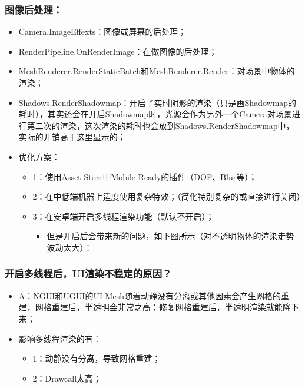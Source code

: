 \documentclass[9pt, b5paper]{article}
\begin{document}
\subsubsection{图像后处理：}
\label{sec:org6a1f73b}
\begin{itemize}
\item Camera.ImageEffexts：图像或屏幕的后处理；
\item RenderPipeline.OnRenderImage：在做图像的后处理；
\item MeshRenderer.RenderStaticBatch和MeshRenderer.Render：对场景中物体的渲染；
\item Shadows.RenderShadowmap：开启了实时阴影的渲染（只是画Shadowmap的耗时），其实还会在开启Shadowmap时，光源会作为另外一个Camera对场景进行第二次的渲染，这次渲染的耗时也会放到Shadows.RenderShadowmap中，实际的开销高于这里显示的；
\item 优化方案：
\begin{itemize}
\item 1：使用Asset Store中Mobile Ready的插件（DOF、Blur等）；
\item 2：在中低端机器上适度使用复杂特效；（简化特别复杂的或直接进行关闭）
\item 3：在安卓端开启多线程渲染功能（默认不开启）；
\begin{itemize}
\item 但是开启后会带来新的问题，如下图所示（对不透明物体的渲染走势波动太大）：
\end{itemize}
\end{itemize}
\end{itemize}
\subsubsection{开启多线程后，UI渲染不稳定的原因？}
\label{sec:orgc7be2a8}
\begin{itemize}
\item A：NGUI和UGUI的UI Mesh随着动静没有分离或其他因素会产生网格的重建，网格重建后，半透明会非常之高；修复网格重建后，半透明渲染就能降下来；
\item 影响多线程渲染的有：
\begin{itemize}
\item 1：动静没有分离，导致网格重建；
\item 2：Drawcall太高；
\end{itemize}
\end{itemize}
\end{document}

